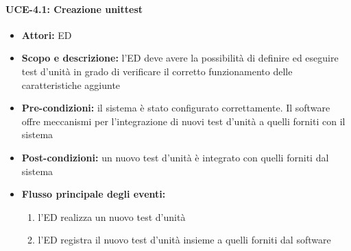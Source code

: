 \paragraph{UCE-4.1: Creazione unittest}

\begin{itemize}
	\item \textbf{Attori:} ED
	\item \textbf{Scopo e descrizione:} l'ED deve avere la possibilità di definire ed eseguire test d'unità in grado di verificare il corretto funzionamento delle caratteristiche aggiunte
	\item \textbf{Pre-condizioni:} il sistema è stato configurato correttamente. Il software offre meccanismi per l'integrazione di nuovi test d'unità a quelli forniti con il sistema
	\item \textbf{Post-condizioni:} un nuovo test d'unità è integrato con quelli forniti dal sistema
	\item \textbf{Flusso principale degli eventi:}
		\begin{enumerate}
			\item l'ED realizza un nuovo test d'unità
			\item l'ED registra il nuovo test d'unità insieme a quelli forniti dal software
		\end{enumerate}
\end{itemize}

